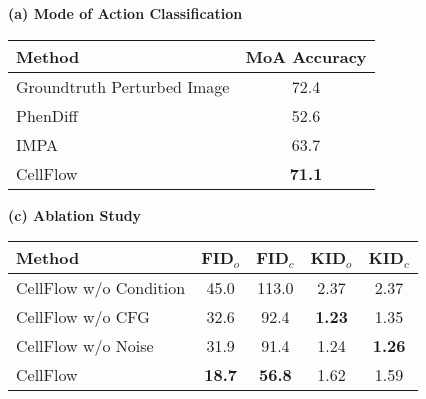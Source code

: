 \begin{table*}[!tb]
    \small
    \centering
    \setlength\tabcolsep{6pt}
    \renewcommand{\arraystretch}{1.1}
    
    \begin{minipage}[t]{0.45\textwidth}
        \centering
        \textbf{(a) Mode of Action Classification} \\
        \begin{tabular}{lc}
        \toprule
        Method & MoA Accuracy  \\
        \midrule
        Groundtruth Perturbed Image & 72.4 \\
        \midrule
        PhenDiff & 52.6 \\
        IMPA & 63.7 \\
        CellFlow & \textbf{71.1} \\
        \bottomrule
        \end{tabular}
    \end{minipage}
    \hfill
    \begin{minipage}[t]{0.54\textwidth}
        \centering
        \textbf{(c) Ablation Study} \\
        \begin{tabular}{lcccc}
        \toprule
        Method & FID$_o$ & FID$_c$ & KID$_o$ & KID$_c$ \\
        \midrule
        CellFlow w/o Condition & 45.0 & 113.0 & 2.37 & 2.37 \\
        CellFlow w/o CFG & 32.6 & 92.4 & \textbf{1.23} & 1.35 \\
        CellFlow w/o Noise & 31.9 & 91.4 & 1.24 & \textbf{1.26} \\
        CellFlow & \textbf{18.7} & \textbf{56.8} & 1.62 & 1.59 \\
        \bottomrule
        \end{tabular}
    \end{minipage}
    
    \vspace{1em}
    

\end{table*}
